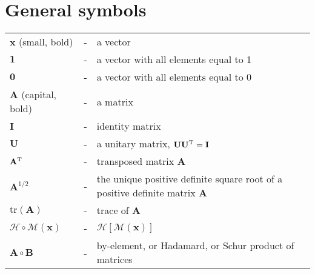 \documentclass[11pt]{report}
\newcommand{\mb} {\mathbf}
\newcommand{\T}{^{\tiny \mathrm T}}
\begin{document}
\section*{General symbols}
\begin{tabular}{lll}
  $\mb x$ (small, bold) &-& a vector \\
  $\mb 1$ &-& a vector with all elements equal to 1 \\
  $\mb 0$ &-& a vector with all elements equal to 0 \\
  $\mb A$ (capital, bold) &-& a matrix \\
  $\mb I$ &-& identity matrix \\
  $\mb U$ &-& a unitary matrix, $\mb U \mb U\T = \mb I$ \\
  $\mb A\T$ &-& transposed matrix $\mb A$ \\
  $\mb A^{1/2}$ &-& the unique positive definite square root of a positive definite matrix $\mb A$ \\
  $\mathrm{tr}(\mb A)$ &-& trace of $\mb A$ \\
  $\mathcal H \circ \mathcal M(\mb x)$ &-& $\mathcal H \left[ \mathcal M (\mb x) \right]$ \\
  $\mb A \circ \mb B$ &-& by-element, or Hadamard, or Schur product of matrices
\end{tabular}
\end{document}
